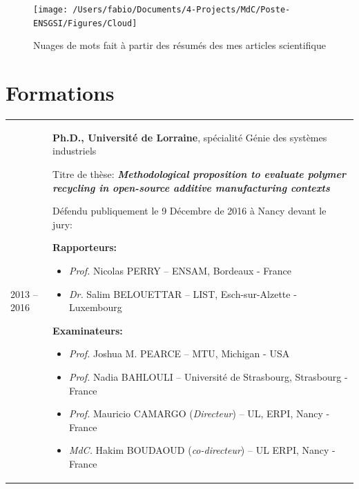 \documentclass[
  12pt,
  oneside]{book}
\begin{document}
\begin{figure}

{\centering \texttt{[image: /Users/fabio/Documents/4-Projects/MdC/Poste-ENSGSI/Figures/Cloud]} 

}

\caption{Nuages de mots fait à partir des résumés des mes articles scientifique}\label{fig:unnamed-chunk-2}
\end{figure}

\hypertarget{formations}{%
\section{Formations}\label{formations}}

\begin{tabu} to \linewidth {X[0.4,l] X[2,l]}

2013 -- 2016 & \textbf{Ph.D., Université de Lorraine}, spécialité Génie des systèmes industriels \par
    Titre de thèse: \textbf{\emph{Methodological proposition to evaluate polymer recycling in open-source additive manufacturing contexts}} \par\vspace{5pt}
    
Défendu publiquement le 9 Décembre de 2016 à Nancy devant le jury:\par\vspace{5pt}

    \textbf{Rapporteurs:}
    \begin{itemize}
    
        \item \textit{Prof.} Nicolas PERRY --  ENSAM, Bordeaux - France
        \item \textit{Dr.} Salim BELOUETTAR -- LIST, Esch-sur-Alzette - Luxembourg
    \end{itemize}

\vspace{5pt}
    \textbf{Examinateurs:}
    \begin{itemize}
    
        \item \textit{Prof.} Joshua M. PEARCE -- MTU, Michigan - USA
        \item \textit{Prof.} Nadia BAHLOULI -- Université de Strasbourg, Strasbourg - France
        \item \textit{Prof.} Mauricio CAMARGO (\textit{Directeur}) -- UL, ERPI, Nancy - France
        
        \item \textit{MdC.} Hakim BOUDAOUD (\textit{co-directeur}) -- UL ERPI, Nancy - France
        

\end{itemize}
\end{tabu}
\end{document}
